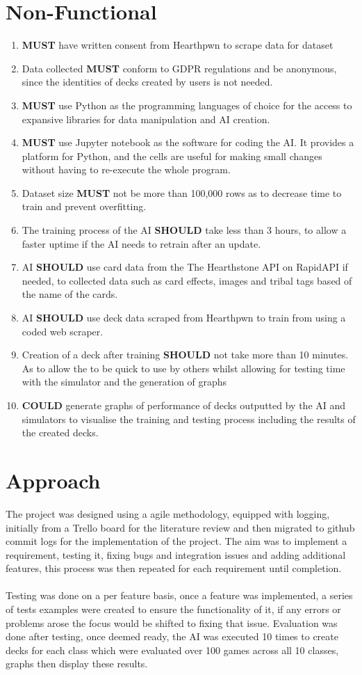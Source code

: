 \documentclass{report} %
\begin{document}
\section{Non-Functional}
\begin{enumerate}
\item \textbf{MUST} have written consent from Hearthpwn to scrape data for dataset
\item Data collected \textbf{MUST} conform to GDPR regulations and be anonymous, since the identities of decks created by users is not needed.
\item \textbf{MUST} use Python as the programming languages of choice for the access to expansive libraries for data manipulation and AI creation.
\item \textbf{MUST} use Jupyter notebook as the software for coding the AI. It provides a platform for Python, and the cells are useful for making small changes without having to re-execute the whole program.
\item Dataset size \textbf{MUST} not be more than 100,000 rows as to decrease time to train and prevent overfitting.
\item The training process of the AI \textbf{SHOULD} take less than 3 hours, to allow a faster uptime if the AI needs to retrain after an update.
\item AI \textbf{SHOULD} use card data from the The Hearthstone API on RapidAPI if needed, to collected data such as card effects, images and tribal tags based of the name of the cards.
\item AI \textbf{SHOULD} use deck data scraped from Hearthpwn to train from using a coded web scraper.
\item Creation of a deck after training \textbf{SHOULD} not take more than 10 minutes. As to allow the to be quick to use by others whilst allowing for testing time with the simulator and the generation of graphs
\item \textbf{COULD} generate graphs of performance of decks outputted by the AI and simulators to visualise the training and testing process including the results of the created decks. 
\end{enumerate}
\section{Approach}
The project was designed using a agile methodology, equipped with logging, initially from a Trello board for the literature review and then migrated to github commit logs for the implementation of the project. The aim was to implement a requirement, testing it, fixing bugs and integration issues and adding additional features, this process was then repeated for each requirement until completion. \\ \\
Testing was done on a per feature basis, once a feature was implemented, a series of tests examples were created to ensure the functionality of it, if any errors or problems arose the focus would be shifted to fixing that issue. Evaluation was done after testing, once deemed ready, the AI was executed 10 times to create decks for each class which were evaluated over 100 games across all 10 classes, graphs then display these results.
\end{document}
